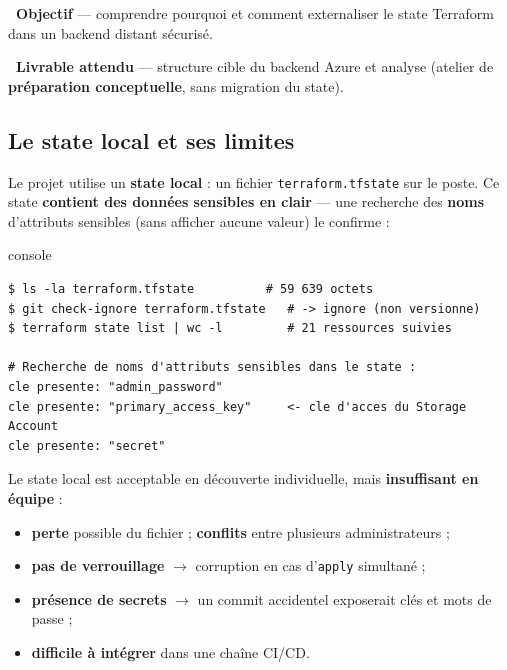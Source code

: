 \documentclass[11pt,a4paper]{article}
\newcommand{\emo}[1]{\raisebox{-0.14em}{\twemoji{#1}}}
\newcommand{\eTarget}{\emo{1f3af}}
\newcommand{\ePackage}{\emo{1f4e6}}
\newcommand{\arr}{\ensuremath{\rightarrow}}
\newcommand{\code}[1]{\texttt{#1}}
\begin{document}
\begin{fiche}
\textbf{\eTarget~Objectif} — comprendre pourquoi et comment externaliser le state Terraform dans un backend distant sécurisé.

\textbf{\ePackage~Livrable attendu} — structure cible du backend Azure et analyse (atelier de \textbf{préparation conceptuelle}, sans migration du state).
\end{fiche}

\subsection{Le state local et ses limites}
Le projet utilise un \textbf{state local} : un fichier \code{terraform.tfstate} sur le poste. Ce state
\textbf{contient des données sensibles en clair} — une recherche des \textbf{noms} d'attributs sensibles (sans
afficher aucune valeur) le confirme :
\begin{codebox}{console}
\begin{Verbatim}
$ ls -la terraform.tfstate          # 59 639 octets
$ git check-ignore terraform.tfstate   # -> ignore (non versionne)
$ terraform state list | wc -l         # 21 ressources suivies

# Recherche de noms d'attributs sensibles dans le state :
cle presente: "admin_password"
cle presente: "primary_access_key"     <- cle d'acces du Storage Account
cle presente: "secret"
\end{Verbatim}
\end{codebox}
Le state local est acceptable en découverte individuelle, mais \textbf{insuffisant en équipe} :
\begin{itemize}
  \item \textbf{perte} possible du fichier ; \textbf{conflits} entre plusieurs administrateurs ;
  \item \textbf{pas de verrouillage} \arr{} corruption en cas d'\code{apply} simultané ;
  \item \textbf{présence de secrets} \arr{} un commit accidentel exposerait clés et mots de passe ;
  \item \textbf{difficile à intégrer} dans une chaîne CI/CD.
\end{itemize}
\end{document}
